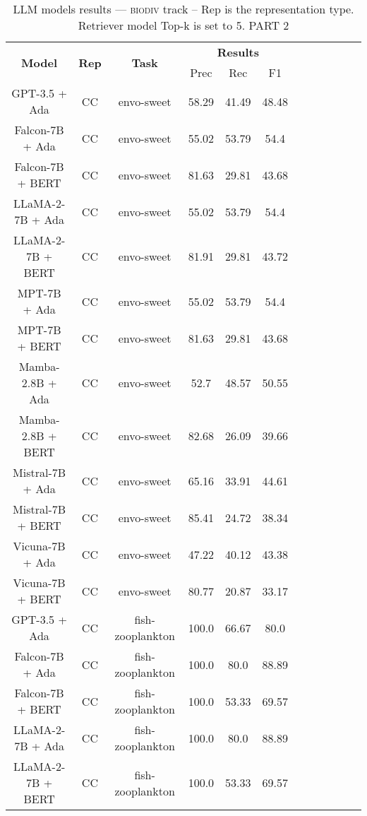 \begin{table}
        \centering
        \small
        \caption{LLM models results --- \textsc{biodiv} track -- Rep is the representation type. Retriever model Top-k is set to 5. PART 2 } \label{tab:llm_biodiv2}
        \begin{tabular}{|c|c|c|c|c|c|c|c|c|c|c|c|}
            \hline
             \multirow{2}{*}{\textbf{Model}}  & \multirow{2}{*}{\textbf{Rep}}  & \multirow{2}{*}{\textbf{Task}} &  \multicolumn{3}{c|}{\textbf{Results}} \\
             \cline{4-6}
              & & & Prec & Rec & F1  \\
            \hline
	GPT-3.5 + Ada  & CC & envo-sweet  &  58.29 &  41.49 & 48.48  \\
	Falcon-7B + Ada  & CC & envo-sweet  &  55.02 &  53.79 & 54.4  \\
	Falcon-7B + BERT  & CC & envo-sweet  &  81.63 &  29.81 & 43.68  \\
	LLaMA-2-7B + Ada  & CC & envo-sweet  &  55.02 &  53.79 & 54.4  \\
	LLaMA-2-7B + BERT  & CC & envo-sweet  &  81.91 &  29.81 & 43.72  \\
	MPT-7B + Ada  & CC & envo-sweet  &  55.02 &  53.79 & 54.4  \\
	MPT-7B + BERT  & CC & envo-sweet  &  81.63 &  29.81 & 43.68  \\
	Mamba-2.8B + Ada  & CC & envo-sweet  &  52.7 &  48.57 & 50.55  \\
	Mamba-2.8B + BERT  & CC & envo-sweet  &  82.68 &  26.09 & 39.66  \\
	Mistral-7B + Ada  & CC & envo-sweet  &  65.16 &  33.91 & 44.61  \\
	Mistral-7B + BERT  & CC & envo-sweet  &  85.41 &  24.72 & 38.34  \\
	Vicuna-7B + Ada  & CC & envo-sweet  &  47.22 &  40.12 & 43.38  \\
	Vicuna-7B + BERT  & CC & envo-sweet  &  80.77 &  20.87 & 33.17  \\
	\hline
	GPT-3.5 + Ada  & CC & fish-zooplankton  &  100.0 &  66.67 & 80.0  \\
	Falcon-7B + Ada  & CC & fish-zooplankton  &  100.0 &  80.0 & 88.89  \\
	Falcon-7B + BERT  & CC & fish-zooplankton  &  100.0 &  53.33 & 69.57  \\
	LLaMA-2-7B + Ada  & CC & fish-zooplankton  &  100.0 &  80.0 & 88.89  \\
	LLaMA-2-7B + BERT  & CC & fish-zooplankton  &  100.0 &  53.33 & 69.57  \\

\end{tabular}
\end{table}
